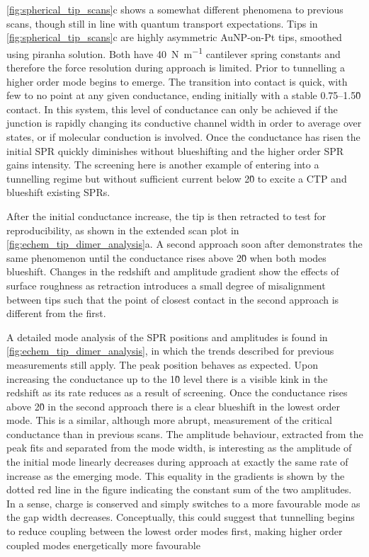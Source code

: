 \documentclass[a4paper]{article}
\begin{document}
\begin{figure}[bt]
\label{fig:echem_tip_dimer_analysis}
\end{figure}

\autoref{fig:spherical_tip_scans}c shows a somewhat different phenomena to previous scans, though still in line with quantum transport expectations. Tips in \autoref{fig:spherical_tip_scans}c are highly asymmetric AuNP-on-Pt tips, smoothed using piranha solution. Both have \SI{40}{N.m^{-1}} cantilever spring constants and therefore the force resolution during approach is limited. Prior to tunnelling a higher order mode begins to emerge. The transition into contact is quick, with few to no point at any given conductance, ending initially with a stable 0.75--1.5\G0 contact. In this system, this level of conductance can only be achieved if the junction is rapidly changing its conductive channel width in order to average over states, or if molecular conduction is involved. Once the conductance has risen the initial SPR quickly diminishes without blueshifting and the higher order SPR gains intensity. The screening here is another example of entering into a tunnelling regime but without sufficient current below 2\G0 to excite a CTP and blueshift existing SPRs.

After the initial conductance increase, the tip is then retracted to test for reproducibility, as shown in the extended scan plot in \autoref{fig:echem_tip_dimer_analysis}a. A second approach soon after demonstrates the same phenomenon until the conductance rises above 2\G0 when both modes blueshift. Changes in the redshift and amplitude gradient show the effects of surface roughness as retraction introduces a small degree of misalignment between tips such that the point of closest contact in the second approach is different from the first.

A detailed mode analysis of the SPR positions and amplitudes is found in \autoref{fig:echem_tip_dimer_analysis}, in which the trends described for previous measurements still apply. The peak position behaves as expected. Upon increasing the conductance up to the 1\G0 level there is a visible kink in the redshift as its rate reduces as a result of screening. Once the conductance rises above 2\G0 in the second approach there is a clear blueshift in the lowest order mode. This is a similar, although more abrupt, measurement of the critical conductance than in previous scans. The amplitude behaviour, extracted from the peak fits and separated from the mode width, is interesting as the amplitude of the initial mode linearly decreases during approach at exactly the same rate of increase as the emerging mode. This equality in the gradients is shown by the dotted red line in the figure indicating the constant sum of the two amplitudes. In a sense, charge is conserved and simply switches to a more favourable mode as the gap width decreases. Conceptually, this could suggest that tunnelling begins to reduce coupling between the lowest order modes first, making higher order coupled modes energetically more favourable
\end{document}

